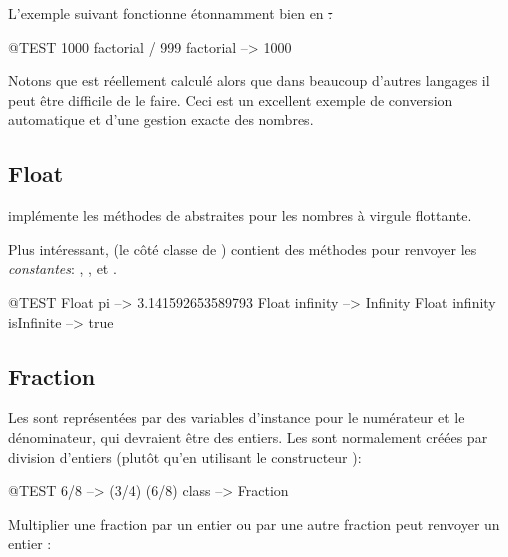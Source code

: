 \documentclass[a4paper,10pt,twoside]{book}
\begin{document}
L'exemple suivant fonctionne étonnamment bien en \st:
\begin{code}{@TEST}
1000 factorial / 999 factorial --> 1000
\end{code}
Notons que  est réellement calculé alors que dans beaucoup d'autres langages il peut être difficile de le faire. Ceci est un excellent exemple de conversion automatique et d'une gestion exacte des nombres.


\subsection{Float}

 implémente les méthodes de  abstraites pour les nombres à virgule flottante.

Plus intéressant,  (\ie le côté classe de ) contient des méthodes pour renvoyer les \emph{constantes}: , ,  et .

\begin{code}{@TEST}
Float pi                      --> 3.141592653589793
Float infinity               --> Infinity
Float infinity isInfinite --> true
\end{code}

\subsection{Fraction}

Les  sont représentées par des variables d'instance pour le numérateur et le dénominateur, qui devraient être des entiers. Les  sont normalement créées par division d'entiers (plutôt qu'en utilisant le constructeur ):

\begin{code}{@TEST}
6/8             --> (3/4)
(6/8) class --> Fraction
\end{code}

Multiplier une fraction par un entier ou par une autre fraction peut renvoyer un entier :
\end{document}
